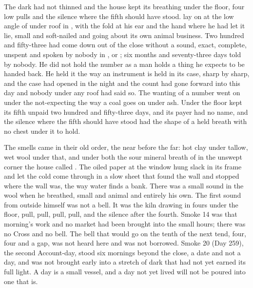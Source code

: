 
The dark had not thinned and the house kept its breathing under the floor, four low pulls and the silence where the fifth should have stood.  lay on  at the low angle of  under  roof in , with the fold at his ear and the hand where he had let it lie, small and soft-nailed and going about its own animal business. Two hundred and fifty-three had come down out of the close without a sound, exact, complete, unspent and spoken by nobody in ,  or ; six months and seventy-three days told by nobody. He did not hold the number as a man holds a thing he expects to be handed back. He held it the way an instrument is held in its case, sharp by sharp, and the case had opened in the night and the count had gone forward into this day and nobody under any roof had said so. The wanting of a number went on under the not-expecting the way a coal goes on under ash. Under the floor  kept its fifth unpaid two hundred and fifty-three days, and its payer had no name, and the silence where the fifth should have stood had the shape of a held breath with no chest under it to hold.

The smells came in their old order, the near before the far: hot clay under tallow, wet wool under that, and under both the sour mineral breath of  in the unswept corner the house called . The oiled paper at the window hung slack in its frame and let the cold come through in a slow sheet that found the wall and stopped where the wall was, the way water finds a bank. There was a small sound in the wool when he breathed, small and animal and entirely his own. The first sound from outside himself was not a bell. It was the kiln drawing in fours under the floor, pull, pull, pull, pull, and the silence after the fourth. Smoke 14 was that morning's work and no market had been brought into the small hours; there was no Cross and no bell. The bell that would go on the tenth of the next tend, four, four and a gap, was not heard here and was not borrowed. Smoke 20 (Day 259), the second Account-day, stood six mornings beyond the close, a date and not a day, and was not brought early into a stretch of dark that had not yet earned its full light. A day is a small vessel, and a day not yet lived will not be poured into one that is.

